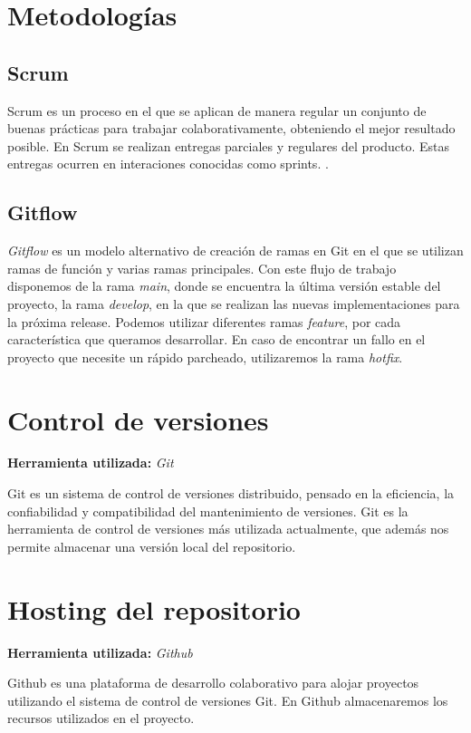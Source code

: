 
\section{Metodologías}

\subsection{Scrum}
Scrum es un proceso en el que se aplican de manera regular un conjunto de buenas prácticas para trabajar colaborativamente, obteniendo el mejor resultado posible. En Scrum se realizan entregas parciales y regulares del producto. Estas entregas ocurren en interaciones conocidas como sprints. \cite{pa:scrum}.

\subsection{Gitflow}
\emph{Gitflow} es un modelo alternativo de creación de ramas en Git en el que se utilizan ramas de función y varias ramas principales. Con este flujo de trabajo disponemos de la rama \emph{main}, donde se encuentra la última versión estable del proyecto, la rama \emph{develop}, en la que se realizan las nuevas implementaciones para la próxima release. Podemos utilizar diferentes ramas \emph{feature}, por cada característica que queramos desarrollar. En caso de encontrar un fallo en el proyecto que necesite un rápido parcheado, utilizaremos la rama \emph{hotfix}\cite{atla:gitflow}.

\section{Control de versiones}
\textbf{Herramienta utilizada: } \emph{Git}

Git es un sistema de control de versiones distribuido, pensado en la eficiencia, la confiabilidad y compatibilidad del mantenimiento de versiones\cite{wiki:git}. Git es la herramienta de control de versiones más utilizada actualmente, que además nos permite almacenar una versión local del repositorio.

\section{Hosting del repositorio}
\textbf{Herramienta utilizada: }\emph{Github}

Github es una plataforma de desarrollo colaborativo para alojar proyectos utilizando el sistema de control de versiones Git\cite{wiki:github}. En Github almacenaremos los recursos utilizados en el proyecto.

